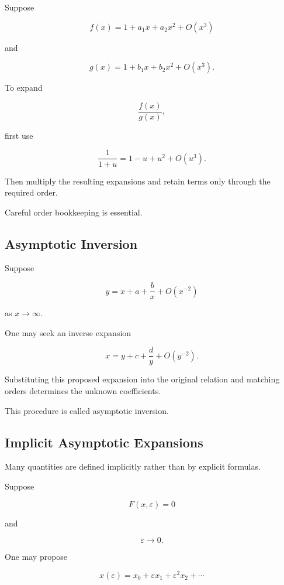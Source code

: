 Suppose

\[
f(x)
=
1+a_1x+a_2x^2+O(x^3)
\]

and

\[
g(x)
=
1+b_1x+b_2x^2+O(x^3).
\]

To expand

\[
\frac{f(x)}{g(x)},
\]

first use

\[
\frac1{1+u}
=
1-u+u^2+O(u^3).
\]

Then multiply the resulting expansions and retain terms only through the
required order.

Careful order bookkeeping is essential.

\subsection{Asymptotic Inversion}
\label{subsec:asymptotic-inversion}

Suppose

\[
y
=
x+a+\frac{b}{x}
+
O(x^{-2})
\]

as \(x\to\infty\).

One may seek an inverse expansion

\[
x
=
y+c+\frac{d}{y}
+
O(y^{-2}).
\]

Substituting this proposed expansion into the original relation and
matching orders determines the unknown coefficients.

This procedure is called asymptotic inversion.

\subsection{Implicit Asymptotic Expansions}
\label{subsec:implicit-asymptotic-expansions}

Many quantities are defined implicitly rather than by explicit formulas.

Suppose

\[
F(x,\varepsilon)=0
\]

and

\[
\varepsilon\to0.
\]

One may propose

\[
\boxed{
x(\varepsilon)
=
x_0+\varepsilon x_1+\varepsilon^2x_2+\cdots
}
\]


